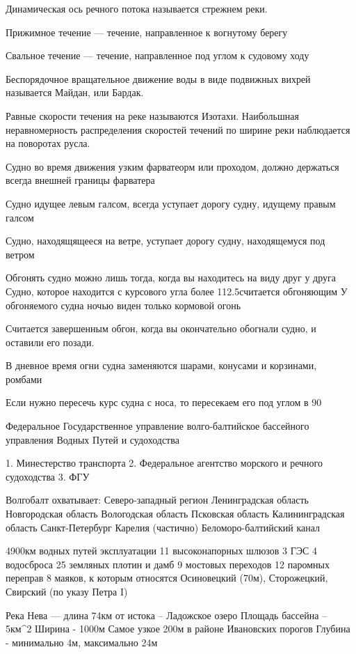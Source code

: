 \documentclass{article}        %
\begin{document}
\begin{description}
Динамическая ось речного потока называется стрежнем реки.

Прижимное течение --- течение, направленное к вогнутому берегу

Свальное течение --- течение, направленное под углом к судовому ходу

Беспорядочное вращательное движение воды в виде подвижных вихрей называется Майдан, или Бардак.

Равные скорости течения на реке называются Изотахи. Наибольшная неравномерность распределения скоростей течений по ширине реки наблюдается на поворотах русла.

Судно во время движения узким фарватеорм или проходом, должно держаться всегда внешней границы фарватера

Судно идущее левым галсом, всегда уступает дорогу судну, идущему правым галсом

Судно, находящящееся на ветре, уступает дорогу судну, находящемуся под ветром

Обгонять судно можно лишь тогда, когда вы находитесь на виду друг у друга
Судно, которое находится с курсового угла более 112.5\degree считается обгоняющим
У обгоняемого судна ночью виден только кормовой огонь

Считается завершенным обгон, когда вы окончательно обогнали судно, и оставили его позади.

В дневное время огни судна заменяются шарами, конусами и корзинами, ромбами

Если нужно пересечь курс судна с носа, то пересекаем его под углом в 90\degree

Федеральное Государственное управление волго-балтийское бассейного 
управления Водных Путей и судоходства

1. Минестерство транспорта
2. Федеральное агентство морского и речного судоходства
3. ФГУ

Волгобалт охватывает:
	Северо-западный регион
	Ленинградская область
	Новгородская область
	Вологодская область
	Псковская область
	Калининградская область
	Санкт-Петербург
	Карелия (частично)
	Беломоро-балтийский канал

4900км водных путей эксплуатации
11 высоконапорных шлюзов
3 ГЭС
4 водосброса
25 земляных плотин и дамб
9 мостовых переходов
12 паромных переправ
8 маяков, к которым относятся Осиновецкий (70м), Сторожецкий, Свирский (по указу Петра I)


Река Нева --- длина 74км от истока -- Ладожское озеро
Площадь бассейна -- 5км^2
Ширина - 1000м
Самое узкое 200м в районе Ивановских порогов
Глубина - минимально 4м, максимально 24м


\end{description}
\end{document}
